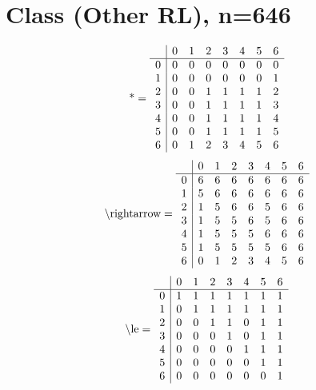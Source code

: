 \documentclass[11pt]{article}
\begin{document}
\section{Class (Other RL), n=646}
\[\text{*} = 
\begin{array}{r | r r r r r r r}
 & 0 & 1 & 2 & 3 & 4 & 5 & 6 \\ \hline
0 & 0 & 0 & 0 & 0 & 0 & 0 & 0 \\
1 & 0 & 0 & 0 & 0 & 0 & 0 & 1 \\
2 & 0 & 0 & 1 & 1 & 1 & 1 & 2 \\
3 & 0 & 0 & 1 & 1 & 1 & 1 & 3 \\
4 & 0 & 0 & 1 & 1 & 1 & 1 & 4 \\
5 & 0 & 0 & 1 & 1 & 1 & 1 & 5 \\
6 & 0 & 1 & 2 & 3 & 4 & 5 & 6 \\
\end{array}
\]
\[\text{\textbackslash rightarrow} = 
\begin{array}{r | r r r r r r r}
 & 0 & 1 & 2 & 3 & 4 & 5 & 6 \\ \hline
0 & 6 & 6 & 6 & 6 & 6 & 6 & 6 \\
1 & 5 & 6 & 6 & 6 & 6 & 6 & 6 \\
2 & 1 & 5 & 6 & 6 & 5 & 6 & 6 \\
3 & 1 & 5 & 5 & 6 & 5 & 6 & 6 \\
4 & 1 & 5 & 5 & 5 & 6 & 6 & 6 \\
5 & 1 & 5 & 5 & 5 & 5 & 6 & 6 \\
6 & 0 & 1 & 2 & 3 & 4 & 5 & 6 \\
\end{array}
\]
\[\text{\textbackslash le} = 
\begin{array}{r | r r r r r r r}
 & 0 & 1 & 2 & 3 & 4 & 5 & 6 \\ \hline
0 & 1 & 1 & 1 & 1 & 1 & 1 & 1 \\
1 & 0 & 1 & 1 & 1 & 1 & 1 & 1 \\
2 & 0 & 0 & 1 & 1 & 0 & 1 & 1 \\
3 & 0 & 0 & 0 & 1 & 0 & 1 & 1 \\
4 & 0 & 0 & 0 & 0 & 1 & 1 & 1 \\
5 & 0 & 0 & 0 & 0 & 0 & 1 & 1 \\
6 & 0 & 0 & 0 & 0 & 0 & 0 & 1 \\
\end{array}
\]
\end{document}
